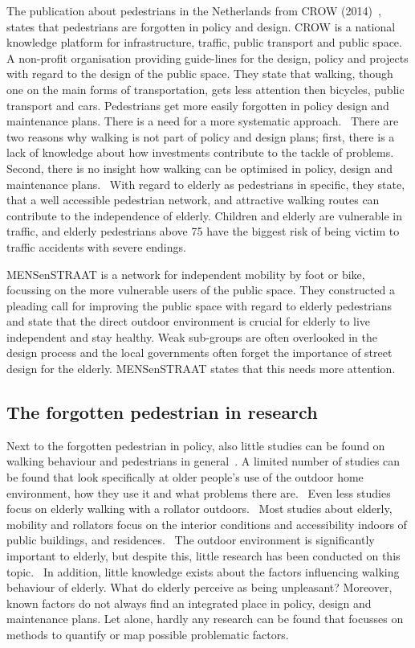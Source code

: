 The publication about pedestrians in the Netherlands from CROW (2014)~\cite{Crow2014}, states that pedestrians are forgotten in policy and design. CROW is a national knowledge platform for infrastructure, traffic, public transport and public space. A non-profit organisation providing guide-lines for the design, policy and projects with regard to the design of the public space. They state that walking, though one on the main forms of transportation, gets less attention then bicycles, public transport and cars. Pedestrians get more easily forgotten in policy design and maintenance plans. There is a need for a more systematic approach.~\cite{Crow2014} There are two reasons why walking is not part of policy and design plans; first, there is a lack of knowledge about how investments contribute to the tackle of problems. Second, there is no insight how walking can be optimised in policy, design and maintenance plans.~\cite{Crow2014}
With regard to elderly as pedestrians in specific, they state, that a well accessible pedestrian network, and attractive walking routes can contribute to the independence of elderly. Children and elderly are vulnerable in traffic, and elderly pedestrians above 75 have the biggest risk of being victim to traffic accidents with severe endings.~\cite{Crow2014}

MENSenSTRAAT is a network for independent mobility by foot or bike, focussing on the more vulnerable users of the public space. They constructed a pleading call for improving the public space with regard to elderly pedestrians and state that the direct outdoor environment is crucial for elderly to live independent and stay healthy. Weak sub-groups are often overlooked in the design process and the local governments often forget the importance of street design for the elderly. MENSenSTRAAT states that this needs more attention.~\cite{MENSenSTRAAT2014} 

\subsection{The forgotten pedestrian in research}
Next to the forgotten pedestrian in policy, also little studies can be found on walking behaviour and pedestrians in general~\cite{Vine2012}. A limited number of studies can be found that look specifically at older people's use of the outdoor home environment, how they use it and what problems there are.~\cite{Phillips2013, Stahl2008} Even less studies focus on elderly walking with a rollator outdoors.~\cite{Stahl2008, Stahl2013, Phillips2013} Most studies about elderly, mobility and rollators focus on the interior conditions and accessibility indoors of public buildings, and residences.~\cite{Crow2014, Sauter2010, Verschuur2013} The outdoor environment is significantly important to elderly, but despite this, little research has been conducted on this topic.~\cite{Stahl2008} In addition, little knowledge exists about the factors influencing walking behaviour of elderly. What do elderly perceive as being unpleasant? Moreover, known factors do not always find an integrated place in policy, design and maintenance plans. Let alone, hardly any research can be found that focusses on methods to quantify or map possible problematic factors. 

